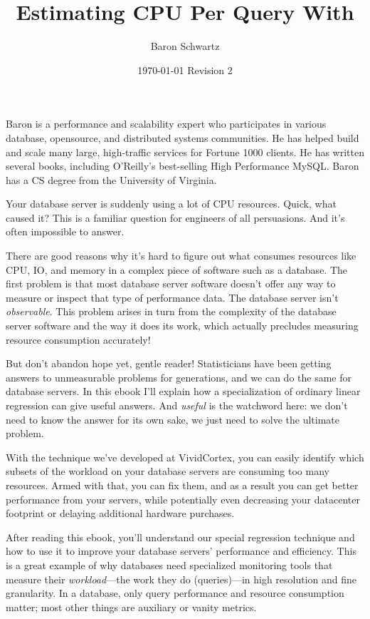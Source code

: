 \documentclass{vivid_layout}
\title{Estimating CPU Per Query With}{\fontsize{27pt}{15pt}\selectfont Weighted Linear Regression}
\date{\color{white} \today{} \textbullet{} Revision 2}
\author{Baron Schwartz}{img/baron}
\begin{document}
\maketitle		%
\begin{bio}		%
Baron is a performance and scalability expert who participates in various
database, opensource, and distributed systems communities. He has helped build
and scale many large, high-traffic services for Fortune 1000 clients. He has
written several books, including O'Reilly's best-selling High Performance MySQL.
Baron has a CS degree from the University of Virginia.
\end{bio}
\tableofcontents	%

Your database server is suddenly using a lot of CPU resources. Quick, what caused it? This is a familiar question for engineers of all persuasions. And it's often impossible to answer.

There are good reasons why it's hard to figure out what consumes resources like CPU, IO, and memory in a complex piece of software such as a database. The first problem is that most database server software doesn't offer any way to measure or inspect that type of performance data. The database server isn't \emph{observable}. This problem arises in turn from the complexity of the database server software and the way it does its work, which actually precludes measuring resource consumption accurately!

But don't abandon hope yet, gentle reader! Statisticians have been getting answers to unmeasurable problems for generations, and we can do the same for database servers. In this ebook I'll explain how a specialization of ordinary linear regression can give useful answers. And \emph{useful} is the watchword here: we don't need to know the answer for its own sake, we just need to solve the ultimate problem.

With the technique we've developed at VividCortex, you can easily identify which subsets of the workload on your database servers are consuming too many resources. Armed with that, you can fix them, and as a result you can get better performance from your servers, while potentially even decreasing your datacenter footprint or delaying additional hardware purchases.

After reading this ebook, you'll understand our special regression technique and how to use it to improve your database servers' performance and efficiency. This is a great example of why databases need specialized monitoring tools that measure their \emph{workload}---the work they do (queries)---in high resolution and fine granularity. In a database, only query performance and resource consumption matter; most other things are auxiliary or vanity metrics.
\end{document}
